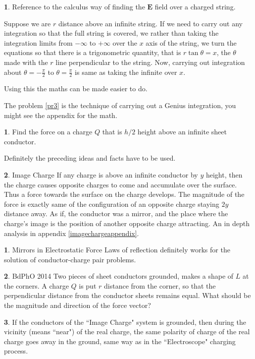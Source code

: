 \documentclass[11pt,a4paper,twocolumn,openright]{article}
\renewcommand{\vec}[1]{\boldsymbol{#1}}
\theoremstyle{definition}
\newtheorem{fct}{ \framebox[0.05\textwidth]{{\sffamily Fact}} }
\theoremstyle{definition}
\newtheorem{pr}{ \framebox[0.05\textwidth]{{\sffamily Pr}} }
\theoremstyle{definition}
\newtheorem{idea}{ \framebox[0.05\textwidth]{{\sffamily Idea}} }
\theoremstyle{definition}
\begin{document}
\begin{fct}
Reference to the calculus way of finding the $\vec{E}$ field over a charged string.


Suppose we are $r$ distance above an infinite string. If we need to carry out any integration so that the full string is covered, we rather than taking the integration limits from $- \infty$ to $ + \infty$ over the $x$ axis of the string, we turn the equations so that there is a trigonometric quantity, that is $r \tan \theta = x $, the $\theta$ made with the $r$ line perpendicular to the string. Now, carrying out integration about $ \theta = -\frac{ \pi }{2 } $ to $ \theta = \frac{\pi}{2} $ is same as taking the infinite over $x$. 
\end{fct}

Using this the maths can be made easier to do.
 
{\small The problem \ref{pr3} is the technique of carrying out a Genius integration, you might see the appendix for the math.}
\begin{pr}
Find the force on a charge $Q$ that is $h/2$ height above an infinite sheet conductor.
\end{pr}
Definitely the preceding ideas and facts have to be used.
\begin{fct}{\sffamily Image Charge}
If any charge is above an infinite conductor by $y$ height, then the charge causes opposite charges to come and accumulate over the surface. Thus a force towards the surface on the charge develops. The magnitude of the force is exactly same of the configuration of an opposite charge staying $2y$ distance away. As if, the conductor was a mirror, and the place where the charge's image is the position of another opposite charge attracting. An in depth analysis in appendix \ref{imagechargeappendix}.
\end{fct}
\begin{idea}{\sffamily Mirrors in Electrostatic Force}
Laws of reflection definitely works for the solution of conductor-charge pair problems.
\end{idea}
%
\begin{pr}{\sffamily BdPhO 2014}
Two pieces of sheet conductors grounded, makes a shape of $L$ at the corners. A charge $Q$ is put $r$ distance from the corner, so that the perpendicular distance from the conductor sheets remains equal. What should be the magnitude and direction of the force vector?
\end{pr}
\begin{fct}
If the conductors of the ``Image Charge" system is grounded, then during the vicinity (means ``near") of the real charge, the same polarity of charge of the real charge goes away in the ground, same way as in the ``Electroscope" charging process.
\end{fct}
\end{document}
